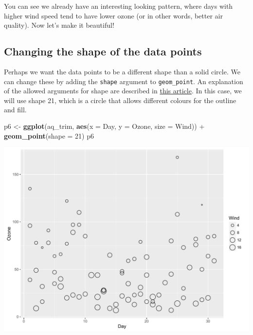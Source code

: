 \documentclass[]{article}
\newenvironment{Shaded}{\begin{snugshade}}{\end{snugshade}}
\newcommand{\KeywordTok}[1]{\textcolor[rgb]{0.13,0.29,0.53}{\textbf{{#1}}}}
\newcommand{\DataTypeTok}[1]{\textcolor[rgb]{0.13,0.29,0.53}{{#1}}}
\newcommand{\DecValTok}[1]{\textcolor[rgb]{0.00,0.00,0.81}{{#1}}}
\newcommand{\StringTok}[1]{\textcolor[rgb]{0.31,0.60,0.02}{{#1}}}
\newcommand{\NormalTok}[1]{{#1}}
\begin{document}
You can see we already have an interesting looking pattern, where days
with higher wind speed tend to have lower ozone (or in other words,
better air quality). Now let's make it beautiful!

\subsection{Changing the shape of the data
points}\label{changing-the-shape-of-the-data-points-1}

Perhaps we want the data points to be a different shape than a solid
circle. We can change these by adding the \texttt{shape} argument to
\texttt{geom\_point}. An explanation of the allowed arguments for shape
are described in
\href{http://sape.inf.usi.ch/quick-reference/ggplot2/shape}{this
article}. In this case, we will use shape 21, which is a circle that
allows different colours for the outline and fill.

\begin{Shaded}
\begin{Highlighting}[]
\NormalTok{p6 <-}\StringTok{ }\KeywordTok{ggplot}\NormalTok{(aq_trim, }\KeywordTok{aes}\NormalTok{(}\DataTypeTok{x =} \NormalTok{Day, }\DataTypeTok{y =} \NormalTok{Ozone, }\DataTypeTok{size =} \NormalTok{Wind)) +}\StringTok{ }
\StringTok{      }\KeywordTok{geom_point}\NormalTok{(}\DataTypeTok{shape =} \DecValTok{21}\NormalTok{)}
\NormalTok{p6}
\end{Highlighting}
\end{Shaded}

\begin{center}\includegraphics{0_all_posts_pdf/wscatter_3-1} \end{center}
\end{document}

